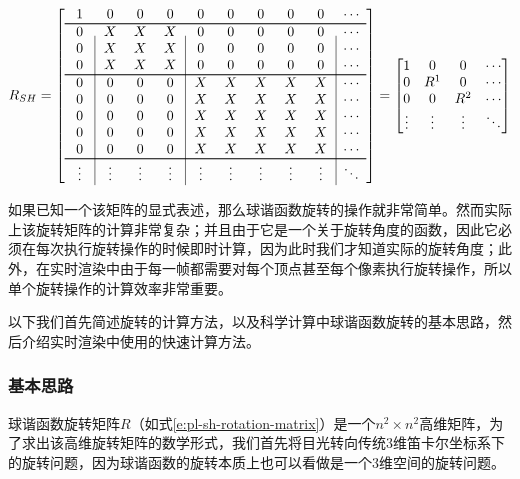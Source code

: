 \begin{equation}\label{e:pl-sh-rotation-matrix}
	R_{SH}=\left[
	\centering
	\begin{array}{c|ccc|ccccc|c}
		\text{ 1 } & \text{ 0 } & \text{ 0 } & \text{ 0 } & \text{ 0 } & \text{ 0 } & \text{ 0 } & \text{ 0 } & \text{ 0 } & \cdots \\
		\hline
		0 & X & X & X & 0 & 0 & 0 & 0 & 0 & \cdots \\
		0 & X & X & X & 0 & 0 & 0 & 0 & 0 & \cdots \\
		0 & X & X & X & 0 & 0 & 0 & 0 & 0 & \cdots \\
		\hline
		0 & 0 & 0 & 0 & X & X & X & X & X & \cdots \\
		0 & 0 & 0 & 0 & X & X & X & X & X & \cdots \\
		0 & 0 & 0 & 0 & X & X & X & X & X & \cdots \\
		0 & 0 & 0 & 0 & X & X & X & X & X & \cdots \\
		0 & 0 & 0 & 0 & X & X & X & X & X & \cdots \\
		\hline
		\vdots & \vdots & \vdots & \vdots & \vdots & \vdots & \vdots & \vdots & \vdots & \ddots
	\end{array}
	\right]=\begin{bmatrix}
		1 & 0     & 0     & \cdots \\
		0 & R^{1} & 0     & \cdots \\
		0 & 0     & R^{2} & \cdots \\
		\vdots & \vdots & \vdots & \ddots 
	\end{bmatrix}
\end{equation}

如果已知一个该矩阵的显式表述，那么球谐函数旋转的操作就非常简单。然而实际上该旋转矩阵的计算非常复杂；并且由于它是一个关于旋转角度的函数，因此它必须在每次执行旋转操作的时候即时计算，因为此时我们才知道实际的旋转角度；此外，在实时渲染中由于每一帧都需要对每个顶点甚至每个像素执行旋转操作，所以单个旋转操作的计算效率非常重要。

以下我们首先简述旋转的计算方法，以及科学计算中球谐函数旋转的基本思路，然后介绍实时渲染中使用的快速计算方法。




\subsubsection{基本思路}
球谐函数旋转矩阵$R$（如式\ref{e:pl-sh-rotation-matrix}）是一个$n^{2}\times n^{2}$高维矩阵，为了求出该高维旋转矩阵的数学形式，我们首先将目光转向传统3维笛卡尔坐标系下的旋转问题，因为球谐函数的旋转本质上也可以看做是一个3维空间的旋转问题。

